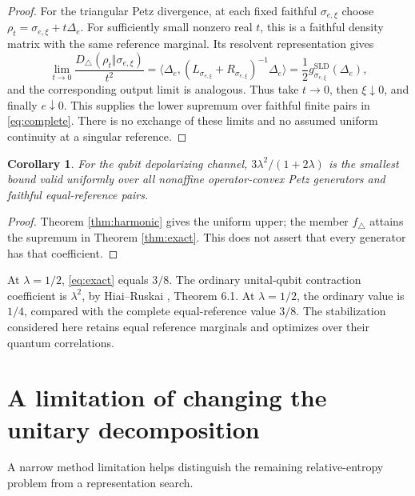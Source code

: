 \documentclass[11pt]{article}
\newcommand{\ip}[2]{\langle #1,#2\rangle}
\newcommand{\Dtri}{D_{\triangle}}
\newcommand{\gmin}{g^{\mathrm{SLD}}}
\newtheorem{corollary}[theorem]{Corollary}
\theoremstyle{remark}
\begin{document}
\begin{proof}
For the triangular Petz divergence, at each fixed faithful \(\sigma_{e,\xi}\) choose
\(\rho_t=\sigma_{e,\xi}+t\Delta_e\).
For sufficiently small nonzero real \(t\), this is a faithful density matrix with the same reference marginal.
Its resolvent representation gives
\[
 \lim_{t\to0}\frac{\Dtri(\rho_t\Vert\sigma_{e,\xi})}{t^2}
 =
 \ip{\Delta_e}{(L_{\sigma_{e,\xi}}+R_{\sigma_{e,\xi}})^{-1}\Delta_e}
 =\frac12\gmin_{\sigma_{e,\xi}}(\Delta_e),
\]
and the corresponding output limit is analogous.
Thus take \(t\to0\), then \(\xi\downarrow0\), and finally \(e\downarrow0\).
This supplies the lower supremum over faithful finite pairs in \eqref{eq:complete}.
There is no exchange of these limits and no assumed uniform continuity at a singular reference.
\end{proof}

\begin{corollary}\label{cor:uniform}
For the qubit depolarizing channel, \(3\lambda^2/(1+2\lambda)\) is the smallest bound valid uniformly over all nonaffine operator-convex Petz generators and faithful equal-reference pairs.
\end{corollary}
\begin{proof}
Theorem \ref{thm:harmonic} gives the uniform upper; the member \(f_\triangle\) attains the supremum in Theorem \ref{thm:exact}.
This does not assert that every generator has that coefficient.
\end{proof}

At \(\lambda=1/2\), \eqref{eq:exact} equals \(3/8\).
The ordinary unital-qubit contraction coefficient is \(\lambda^2\), by Hiai--Ruskai \cite{HR}, Theorem 6.1. At \(\lambda=1/2\), the ordinary value is \(1/4\), compared with the complete equal-reference value \(3/8\).
The stabilization considered here retains equal reference marginals and optimizes over their quantum correlations.

\section{A limitation of changing the unitary decomposition}
A narrow method limitation helps distinguish the remaining relative-entropy problem from a representation search.
\end{document}
